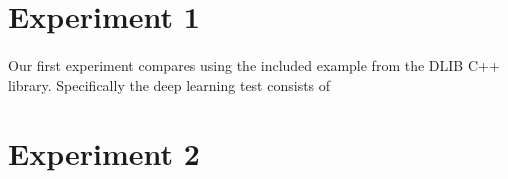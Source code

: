\section{Experiment 1}
\paragraph{}
Our first experiment compares using the included example from the DLIB C++ library. Specifically the deep learning test consists of 

\section{Experiment 2}
\paragraph{}